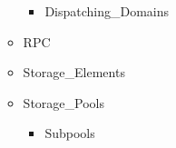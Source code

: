 \documentclass[english]{article}
\begin{document}
\begin{scriptsize}
\begin{multicols*}{5}
\begin{itemize}[leftmargin=0mm]
\begin{itemize}[leftmargin=5mm]
         \begin{itemize}[leftmargin=5mm]
            \item[] Dispatching\_Domains
         \end{itemize}
      \item[] RPC
      \item[] Storage\_Elements
      \item[] Storage\_Pools
         \begin{itemize}[leftmargin=5mm]
            \item[] Subpools
         \end{itemize}
   \end{itemize}
\end{itemize}
\end{multicols*}
\end{scriptsize}
\end{document}

